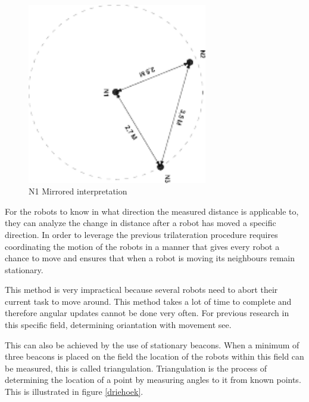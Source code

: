 \documentclass[10pt,a4paper]{article}
\begin{document}
\begin{figure}[H]
\centering
\includegraphics[angle=90,width=0.7\textwidth]{Mirror.pdf}
\caption{N1 Mirrored interpretation}
\label{mirror1}
\end{figure}

For the robots to know in what direction the measured distance is applicable to, they can analyze the change in distance after a robot has moved a specific direction. In order to leverage the previous trilateration procedure requires coordinating the motion of the robots in a manner that gives every robot a chance to move and ensures that when a robot is moving its neighbours remain stationary. \cite{Angle}

This method is very impractical because several robots need to abort their current task to move around. This method takes a lot of time to complete and therefore angular updates cannot be done very often. For previous research in this specific field, determining oriantation with movement see.\cite{delft}

This can also be achieved by the use of stationary beacons. When a minimum of three beacons is placed on the field the location of the robots within this field can be measured, this is called triangulation. Triangulation is the process of determining the location of a point by measuring angles to it from known points. This is illustrated in figure \ref{driehoek}.
\end{document}
